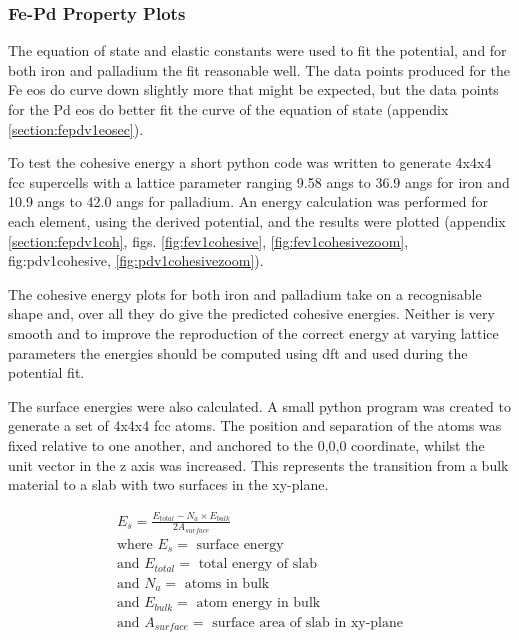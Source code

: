 \FloatBarrier
\subsubsection{Fe-Pd Property Plots}

The equation of state and elastic constants were used to fit the potential, and for both iron and palladium the fit reasonable well.  The data points produced for the Fe \acrshort{eos} do curve down slightly more that might be expected, but the data points for the Pd \acrshort{eos} do better fit the curve of the equation of state (appendix \ref{section:fepdv1eosec}).

To test the cohesive energy a short python code was written to generate 4x4x4 \acrshort{fcc} supercells with a lattice parameter ranging 9.58 angs to 36.9 angs for iron and 10.9 angs to 42.0 angs for palladium.  An energy calculation was performed for each element, using the derived potential, and the results were plotted (appendix \ref{section:fepdv1coh}, figs. \ref{fig:fev1cohesive}, \ref{fig:fev1cohesivezoom}, {fig:pdv1cohesive}, \ref{fig:pdv1cohesivezoom}).

The cohesive energy plots for both iron and palladium take on a recognisable shape and, over all they do give the predicted cohesive energies.  Neither is very smooth and to improve the reproduction of the correct energy at varying lattice parameters the energies should be computed using \acrshort{dft} and used during the potential fit.

The surface energies were also calculated.  A small python program was created to generate a set of 4x4x4 \acrshort{fcc} atoms.  The position and separation of the atoms was fixed relative to one another, and anchored to the 0,0,0 coordinate, whilst the unit vector in the z axis was increased.  This represents the transition from a bulk material to a slab with two surfaces in the xy-plane.

\begin{equation}
\begin{split}
E_s = \frac{E_{total} - N_a \times E_{bulk}}{2A_{surface}} \\
\text{where } E_s = \text{ surface energy} \\
\text{and } E_{total} = \text{ total energy of slab} \\
\text{and } N_a = \text{ atoms in bulk} \\
\text{and } E_{bulk} = \text{ atom energy in bulk} \\
\text{and } A_{surface} = \text{ surface area of slab in xy-plane} \\
\end{split}
\label{eq:newspline}
\end{equation}

